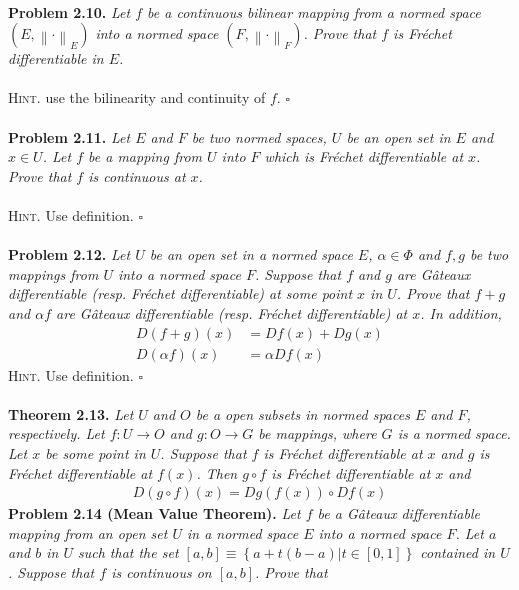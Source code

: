 \documentclass[a4paper]{article}
\numberwithin{equation}{section}
\begin{document}
\\
\textbf{Problem 2.10.} \textit{Let $f$ be a continuous bilinear mapping from a normed space $\left( {E,{{\left\|  \cdot  \right\|}_E}} \right)$ into a normed space $\left( {F,{{\left\|  \cdot  \right\|}_F}} \right)$. Prove that $f$ is Fr\'{e}chet differentiable in $E$.}\\
\\
\textsc{Hint.} use the bilinearity and continuity of $f$. \hfill $\square$\\
\\
\textbf{Problem 2.11.} \textit{Let $E$ and $F$ be two normed spaces, $U$ be an open set in $E$ and $x\in U$. Let $f$ be a mapping from $U$ into $F$ which is Fr\'{e}chet differentiable at $x$. Prove that $f$ is continuous at $x$.}\\
\\
\textsc{Hint.} Use definition. \hfill $\square$\\
\\
\textbf{Problem 2.12.} \textit{Let $U$ be an open set in a normed space $E$, $\alpha  \in \Phi $ and $f,g$ be two mappings from $U$ into a normed space $F$. Suppose that $f$ and $g$ are G\^{a}teaux differentiable (resp. Fr\'{e}chet differentiable) at some point $x$ in $U$. Prove that $f+g$ and $\alpha f$ are G\^{a}teaux differentiable (resp. Fr\'{e}chet differentiable) at $x$. In addition,}
\begin{align}
D\left( {f + g} \right)\left( x \right) &= Df\left( x \right) + Dg\left( x \right)\\
D\left( {\alpha f} \right)\left( x \right) &= \alpha Df\left( x \right)
\end{align}
\textsc{Hint.} Use definition. \hfill $\square$\\
\\
\textbf{Theorem 2.13.} \textit{Let $U$ and $O$ be a open subsets in normed spaces $E$ and $F$, respectively. Let $f:U\to O$ and $g:O\to G$ be mappings, where $G$ is a normed space. Let $x$ be some point in $U$. Suppose that $f$ is Fr\'{e}chet differentiable at $x$ and $g$ is Fr\'{e}chet differentiable at $f\left(x\right)$. Then $g \circ f$ is Fr\'{e}chet differentiable at $x$ and}
\begin{align}
D\left( {g \circ f} \right)\left( x \right) = Dg\left( {f\left( x \right)} \right) \circ Df\left( x \right)
\end{align}
\textbf{Problem 2.14 (Mean Value Theorem).} \textit{Let $f$ be a G\^{a}teaux differentiable mapping from an open set $U$ in a normed space $E$ into a normed space $F$. Let $a$ and $b$ in $U$ such that the set $\left[ {a,b} \right] \equiv \left\{ {a + t\left( {b - a} \right)|t \in \left[ {0,1} \right]} \right\}$ contained in $U$. Suppose that $f$ is continuous on $\left[a,b\right]$. Prove that}
\end{document}
